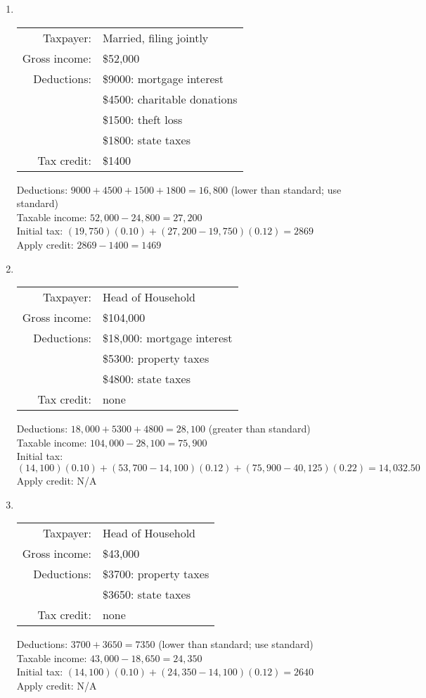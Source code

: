\begin{enumerate}
\item \text{}\\
\begin{tabular}{r l}
Taxpayer: & Married, filing jointly\\
Gross income: & \$52,000\\
Deductions: & \$9000: mortgage interest\\
& \$4500: charitable donations\\
& \$1500: theft loss\\
& \$1800: state taxes\\
Tax credit: & \$1400
\end{tabular} 
\begin{center}
Deductions: $9000 + 4500 + 1500 + 1800 = 16,800$ (lower than standard; use standard)\\
Taxable income: $52,000 - 24,800 = 27,200$\\
Initial tax: $(19,750)(0.10) + (27,200-19,750)(0.12) = 2869$\\
Apply credit: $2869 - 1400 = 1469$
\end{center}

\item \text{}\\
\begin{tabular}{r l}
Taxpayer: & Head of Household\\
Gross income: & \$104,000\\
Deductions: & \$18,000: mortgage interest\\
& \$5300: property taxes\\
& \$4800: state taxes\\
Tax credit: & none
\end{tabular} 
\begin{center}
Deductions: $18,000 + 5300 + 4800 = 28,100$ (greater than standard)\\
Taxable income: $104,000 - 28,100 = 75,900$\\
Initial tax: $(14,100)(0.10) + (53,700-14,100)(0.12) + (75,900-40,125)(0.22) = 14,032.50$\\
Apply credit: N/A
\end{center}

\item \text{}\\
\begin{tabular}{r l}
Taxpayer: & Head of Household\\
Gross income: & \$43,000\\
Deductions: & \$3700: property taxes\\
& \$3650: state taxes\\
Tax credit: & none
\end{tabular} 
\begin{center}
Deductions: $3700 + 3650 = 7350$ (lower than standard; use standard)\\
Taxable income: $43,000 - 18,650 = 24,350$\\
Initial tax: $(14,100)(0.10) + (24,350-14,100)(0.12) = 2640$\\
Apply credit: N/A
\end{center}
\end{enumerate}